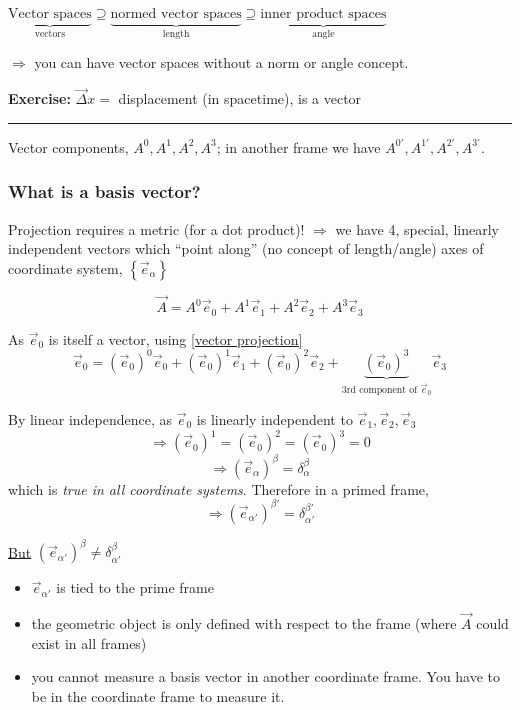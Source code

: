 \documentclass[a4paper]{article} %
\newcommand{\exercise}[2]
{
\begin{framed}
\textbf{Exercise:} #1 \\\hrule
#2
\end{framed}
}
\begin{document}
$\underbrace{\text{Vector spaces}}_{\text{vectors}}\supseteq \underbrace{\text{normed vector spaces}}_{\text{length}} \supseteq \underbrace{\text{inner product spaces}}_{\text{angle}}$

$\Rightarrow$ you can have vector spaces without a norm or angle concept.

\exercise{$\vec{\Delta}x=$ displacement (in spacetime), is a vector}{}

Vector components, $A^0,A^1,A^2,A^3$; in another frame we have $A^{0'},A^{1'},A^{2'},A^{3'}$.

\subsubsection{What is a basis vector?}
Projection requires a metric (for a dot product)!
$\Rightarrow$ we have 4, special, linearly independent vectors which ``point along'' (no concept of length/angle) axes of coordinate system, $\left\{\vec{e}_{\alpha}\right\}$

\begin{equation}
\vec{A}=A^0 \vec{e}_{0} +A^{1}\vec{e}_{1}+A^{2}\vec{e}_{2}+A^{3}\vec{e}_{3} \label{vector projection}
\end{equation}

As $\vec{e}_{0}$ is itself a vector, using \ref{vector projection}
\begin{equation}
\vec{e}_{0}=(\vec{e}_{0})^{0}\vec{e}_{0}+(\vec{e}_{0})^{1}\vec{e}_{1}+(\vec{e}_{0})^{2}\vec{e}_{2}
+\underbrace{(\vec{e}_{0})^{3}}_{\text{3rd component of }\vec{e}_{0}}\vec{e}_{3}
\end{equation}

By linear independence, as $\vec{e}_0$ is linearly independent to $\vec{e}_{1},\vec{e}_{2},\vec{e}_{3}$
\begin{equation}
\Rightarrow (\vec{e}_{0})^{1}=(\vec{e}_{0})^{2}=(\vec{e}_{0})^{3}=0
\end{equation}
\begin{equation}
\Rightarrow (\vec{e}_{\alpha})^{\beta}=\delta_{\alpha}^{\beta}
\end{equation}
which is \emph{true in all coordinate systems}. Therefore in a primed frame,
\begin{equation}
\Rightarrow (\vec{e}_{\alpha'})^{\beta'}=\delta_{\alpha'}^{\beta'}
\end{equation}

\underline{But} $(\vec{e}_{\alpha'})^{\beta}\neq \delta^{\beta}_{\alpha'}$
\begin{itemize}
\item $\vec{e}_{\alpha'}$ is tied to the prime frame
\item the geometric object is only defined with respect to the frame (where $\vec{A}$ could exist in all frames)
\item you cannot measure a basis vector in another coordinate frame. You have to be in the coordinate frame to measure it.
\end{itemize}
\end{document}
